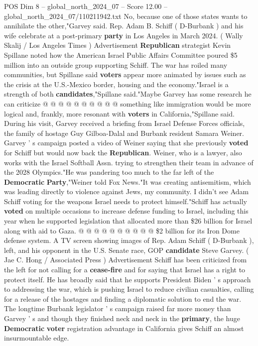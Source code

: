 \begin{textsample}{POS Dim 8 – global\_north\_2024\_07 – Score 12.00 – global\_north\_2024\_07/110211942.txt}
No, because one of those states wants to annihilate the other,"Garvey said.
Rep.
Adam B.
Schiff ( D-Burbank ) and his wife celebrate at a post-primary \textbf{party} in Los Angeles in March 2024. ( Wally Skalij / Los Angeles Times ) Advertisement \textbf{Republican} strategist Kevin Spillane noted how the American Israel Public Affairs Committee poured \$5 million into an outside group supporting Schiff.
The war has roiled many communities, but Spillane said \textbf{voters} appear more animated by issues such as the crisis at the U.S.-Mexico border, housing and the economy."Israel is a strength of both \textbf{candidates},"Spillane said."Maybe Garvey has some research he can criticize @ @ @ @ @ @ @ @ @ @ something like immigration would be more logical and, frankly, more resonant with \textbf{voters} in California,"Spillane said.
During his visit, Garvey received a briefing from Israel Defense Forces officials, the family of hostage Guy Gilboa-Dalal and Burbank resident Samara Weiner.
Garvey ' s campaign posted a video of Weiner saying that she previously \textbf{voted} for Schiff but would now back the \textbf{Republican}.
Weiner, who is a lawyer, also works with the Israel Softball Assn. trying to strengthen their team in advance of the 2028 Olympics."He was pandering too much to the far left of the \textbf{Democratic} \textbf{Party},"Weiner told Fox News."It was creating antisemitism, which was leading directly to violence against Jews, my community.
I didn't see Adam Schiff voting for the weapons Israel needs to protect himself."Schiff has actually \textbf{voted} on multiple occasions to increase defense funding to Israel, including this year when he supported legislation that allocated more than \$26 billion for Israel along with aid to Gaza. @ @ @ @ @ @ @ @ @ @ \$2 billion for its Iron Dome defense system.
A TV screen showing images of Rep.
Adam Schiff ( D-Burbank ), left, and his opponent in the U.S.
Senate race, GOP \textbf{candidate} Steve Garvey. ( Jae C.
Hong / Associated Press ) Advertisement Schiff has been criticized from the left for not calling for a \textbf{cease-fire} and for saying that Israel has a right to protect itself.
He has broadly said that he supports President Biden ' s approach to addressing the war, which is pushing Israel to reduce civilian casualties, calling for a release of the hostages and finding a diplomatic solution to end the war.
The longtime Burbank legislator ' s campaign raised far more money than Garvey ' s and though they finished neck and neck in the \textbf{primary}, the huge \textbf{Democratic} \textbf{voter} registration advantage in California gives Schiff an almost insurmountable edge.

\end{textsample}
